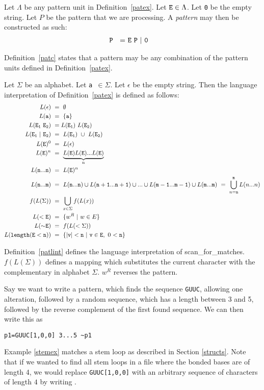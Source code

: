 \begin{mydef}\label{patc}
Let $\Lambda$ be any pattern unit in Definition~\ref{patex}. Let ${\tt E}\in\Lambda$.
Let {\tt 0} be the empty string. Let $P$ be the pattern that we are processing.
A \emph{pattern} may then be constructed as such: 
\begin{align*}
{\tt P~}~=&~{\tt E~P~|~0}
\end{align*}
\end{mydef}
\noindent Definition~\ref{patc} states that a pattern may be any combination of the pattern 
units defined in Definition~\ref{patex}.
\begin{mydef}\label{patlint}
Let $\Sigma$ be an alphabet. Let {\tt a $\in\Sigma$}. Let $\epsilon$ be the empty 
string.
Then the language interpretation of Definition~\ref{patex} is defined as follows:
\begin{align*}
L({\tt \epsilon})~&=~\emptyset\\
L({\tt a})~&=~\{{\tt a}\}\\
L({\tt E_1~E_2})~&=L({\tt E_1})~L({\tt E_2})\\
L({\tt E_1~|~E_2})~&=~L({\tt E}_{\tt 1})~\cup~L({\tt E}_{\tt 2})\\
L({\tt E})^0~&=~L({\tt \epsilon})\\
L({\tt E})^n~&=~\underbrace{L({\tt E})L({\tt E})...L({\tt E})}_\text{n}\\
L({\tt n...n})~&=~L({\tt E})^n\\
L({\tt n...m})~&=~L({\tt n...n})\cup L({\tt n+1...n+1})\cup...\cup L({\tt m-1...m-1})\cup L({\tt m...m})~=~\bigcup\limits_{n={\tt n}}^{\tt m} L(n...n)\\
f(L(\Sigma))~&=~\bigcup\limits_{x\in\Sigma} f(L(x))\\ %
L({\tt <E})~&=~\{w^R~|~w\in E\}\\
L({\tt {\sim}E})~&=~f(L(<\Sigma))\\
L({\tt length(E<n)} )~&=~\{{\tt |v|<n~|~v\in E},~0~{\tt <n}\}
\end{align*}
\end{mydef}
\noindent Definition~\ref{patlint} defines the language interpretation of 
scan\_for\_matches. $f(L(\Sigma))$ defines a mapping \cite[p. 60]{Hopcroft1979} 
which substitutes the current character with the complementary in alphabet 
$\Sigma$. $w^R$ reverses the pattern. 
\begin{myex}\label{stemex}
Say we want to write a pattern, which finds the sequence {\tt GUUC}, allowing 
one alteration, followed by a random sequence, which has a length between 3 and 5, 
followed by the reverse complement of the first found sequence. We can 
then write this as \begin{center}
{\tt p1=GUUC[1,0,0] 3...5 \textasciitilde p1}
\end{center}
\end{myex}
\noindent Example \ref{stemex} matches a stem loop as described in Section 
\ref{structs}. Note that if we wanted to find all stem loops in a file where 
the bonded bases are of length 
4, we would replace {\tt GUUC[1,0,0]} with an arbitrary sequence of characters of length $4$ 
by writing {}.
